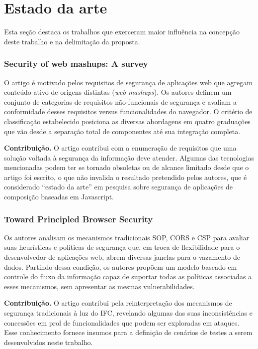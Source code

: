 

\section{Estado da arte}

Esta seção destaca os trabalhos que exerceram maior influência na concepção deste trabalho e na delimitação da proposta.

\subsubsection{Security of web mashups: A survey \cite{DeRyck2012}}
O artigo é motivado pelos requisitos de segurança de aplicações web que agregam conteúdo ativo de origens distintas (\textit{web mashups}). Os autores definem um conjunto de categorias de requisitos não-funcionais de segurança e avaliam a conformidade desses requisitos versus funcionalidades do navegador. O critério de classificação estabelecido posiciona as diversas abordagens em quatro graduações que vão desde a separação total de componentes até sua integração completa.

\textbf{Contribuição.} O artigo contribui com a enumeração de requisitos que uma solução voltada à segurança da informação deve atender. Algumas das tecnologias mencionadas podem ter se tornado obsoletas ou de alcance limitado desde que o artigo foi escrito, o que não invalida o resultado pretendido pelos autores, que é considerado ``estado da arte'' \cite{Hedin2014} em pesquisa sobre segurança de aplicações de composição baseadas em Javascript.


\subsubsection{Toward Principled Browser Security \cite{Yang2013}}
Os autores analisam os mecanismos tradicionais SOP, CORS e CSP para avaliar suas heurísticas e políticas de segurança que, em troca de flexibilidade para o desenvolvedor de aplicações web, abrem diversas janelas para o vazamento de dados. Partindo dessa condição, os autores propõem um modelo baseado em controle do fluxo da informação capaz de suportar todas as políticas associadas a esses mecanismos, sem apresentar as mesmas vulnerabilidades.

\textbf{Contribuição.} O artigo contribui pela reinterpretação dos mecanismos de segurança tradicionais à luz do IFC, revelando algumas das suas inconsistências e concessões em prol de funcionalidades que podem ser exploradas em ataques. Esse conhecimento fornece insumos para a definição de cenários de testes a serem desenvolvidos neste trabalho.


